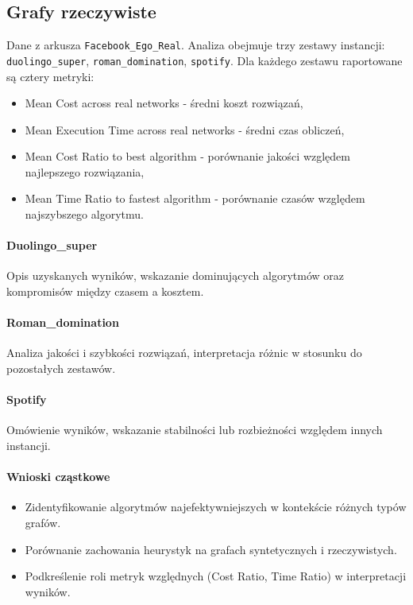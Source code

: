 \subsection{Grafy rzeczywiste}

Dane z arkusza \texttt{Facebook\_Ego\_Real}. Analiza obejmuje trzy zestawy instancji: \texttt{duolingo\_super}, \texttt{roman\_domination}, \texttt{spotify}.
Dla każdego zestawu raportowane są cztery metryki:

\begin{itemize}
    \item Mean Cost across real networks - średni koszt rozwiązań,
    \item Mean Execution Time across real networks - średni czas obliczeń,
    \item Mean Cost Ratio to best algorithm - porównanie jakości względem najlepszego rozwiązania,
    \item Mean Time Ratio to fastest algorithm - porównanie czasów względem najszybszego algorytmu.
\end{itemize}

\paragraph{Duolingo\_super}
Opis uzyskanych wyników, wskazanie dominujących algorytmów oraz kompromisów między czasem a kosztem.

\paragraph{Roman\_domination}
Analiza jakości i szybkości rozwiązań, interpretacja różnic w stosunku do pozostałych zestawów.

\paragraph{Spotify}
Omówienie wyników, wskazanie stabilności lub rozbieżności względem innych instancji.

\paragraph{Wnioski cząstkowe}
\begin{itemize}
    \item Zidentyfikowanie algorytmów najefektywniejszych w kontekście różnych typów grafów.
    \item Porównanie zachowania heurystyk na grafach syntetycznych i rzeczywistych.
    \item Podkreślenie roli metryk względnych (Cost Ratio, Time Ratio) w interpretacji wyników.
\end{itemize}


